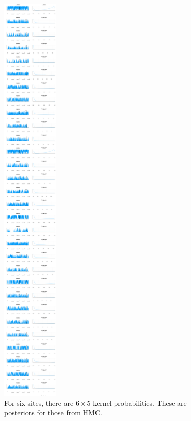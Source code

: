 \documentclass{article}
\begin{document}
\begin{figure}
\includegraphics[height=8in]{dirichlet_driven.png}
\caption{For six sites, there are $6\times 5$ kernel probabilities. These are posteriors for those from HMC.\label{fig:hmc-posterior}}
\end{figure}


\end{document}
